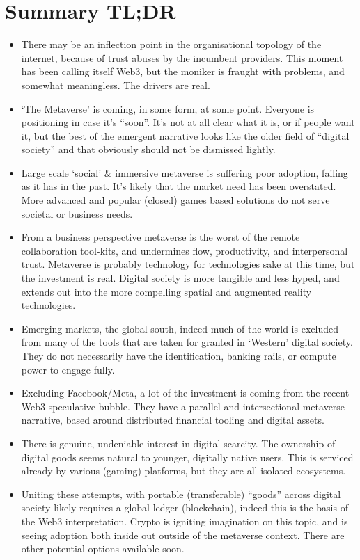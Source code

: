 \section{Summary TL;DR}
\label{sec:tldr}
\begin{itemize}
\item There may be an inflection point in the organisational topology of the internet, because of trust abuses by the incumbent providers. This moment has been calling itself Web3, but the moniker is fraught with problems, and somewhat meaningless. The drivers are real.
\item `The Metaverse' is coming, in some form, at some point. Everyone is positioning in case it's ``soon''. It's not at all clear what it is, or if people want it, but the best of the emergent narrative looks like the older field of ``digital society'' and that obviously should not be dismissed lightly.
\item Large scale `social' \& immersive metaverse is suffering poor adoption, failing as it has in the past. It's likely that the market need has been overstated. More advanced and popular (closed) games based solutions do not serve societal or business needs.
\item From a business perspective metaverse is the worst of the remote collaboration tool-kits, and undermines flow, productivity, and interpersonal trust. Metaverse is probably technology for technologies sake at this time, but the investment is real. Digital society is more tangible and less hyped, and extends out into the more compelling spatial and augmented reality technologies. 
\item Emerging markets, the global south, indeed much of the world is excluded from many of the tools that are taken for granted in `Western' digital society. They do not necessarily have the identification, banking rails, or compute power to engage fully.
\item Excluding Facebook/Meta, a lot of the investment is coming from the recent Web3 speculative bubble. They have a parallel and intersectional metaverse narrative, based around distributed financial tooling and digital assets. 
\item There is genuine, undeniable interest in digital scarcity. The ownership of digital goods seems natural to younger, digitally native users. This is serviced already by various (gaming) platforms, but they are all isolated ecosystems.
\item Uniting these attempts, with portable (transferable) ``goods'' across digital society likely requires a global ledger (blockchain), indeed this is the basis of the Web3 interpretation. Crypto is igniting imagination on this topic, and is seeing adoption both inside out outside of the metaverse context. There are other potential options available soon.

\end{itemize}
